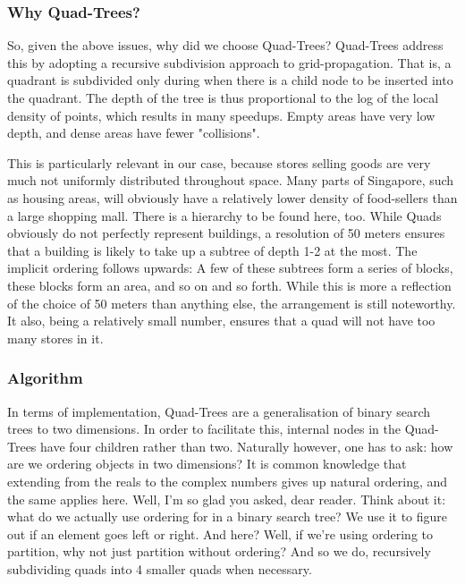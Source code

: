 \documentclass[12pt]{article}
\begin{document}
{\subsubsection{Why Quad-Trees?}

So, given the above issues, why did we choose Quad-Trees? Quad-Trees address this by adopting a recursive subdivision approach to grid-propagation. That is, a quadrant is subdivided only during when there is a child node to be inserted into the quadrant. The depth of the tree is thus proportional to the log of the local density of points, which results in many speedups. Empty areas have very low depth, and dense areas have fewer "collisions".

This is particularly relevant in our case, because stores selling goods are very much not uniformly distributed throughout space. Many parts of Singapore, such as housing areas, will obviously have a relatively lower density of food-sellers than a large shopping mall. There is a hierarchy to be found here, too. While Quads obviously do not perfectly represent buildings, a resolution of 50 meters ensures that a building is likely to take up a subtree of depth 1-2 at the most. The implicit ordering follows upwards: A few of these subtrees form a series of blocks, these blocks form an area, and so on and so forth. While this is more a reflection of the choice of 50 meters than anything else, the arrangement is still noteworthy. It also, being a relatively small number, ensures that a quad will not have too many stores in it.

\subsubsection{Algorithm}

In terms of implementation, Quad-Trees are a generalisation of binary search trees to two dimensions. In order to facilitate this, internal nodes in the Quad-Trees have four children rather than two. Naturally however, one has to ask: how are we ordering objects in two dimensions? It is common knowledge that extending from the reals to the complex numbers gives up natural ordering, and the same applies here. Well, I'm so glad you asked, dear reader. Think about it: what do we actually use ordering for in a binary search tree? We use it to figure out if an element goes left or right. And here? Well, if we're using ordering to partition, why not just partition without ordering? And so we do, recursively subdividing quads into 4 smaller quads when necessary.

}
\end{document}
